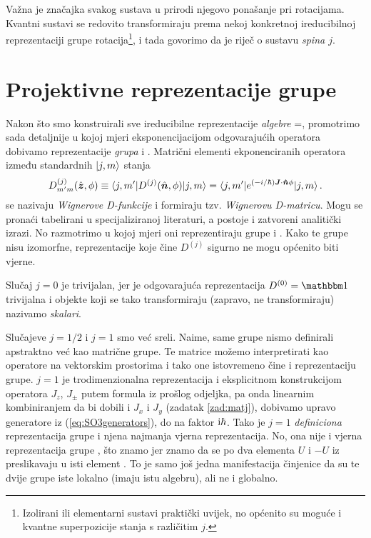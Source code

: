 Važna je značajka svakog sustava u prirodi 
njegovo ponašanje pri rotacijama. Kvantni sustavi se redovito
transformiraju prema nekoj konkretnoj ireducibilnoj reprezentaciji grupe
rotacija\footnote{Izolirani ili elementarni sustavi praktički uvijek, no
    općenito su moguće i kvantne superpozicije stanja s različitim $j$.}, i
 tada govorimo da je riječ o sustavu \emph{spina $j$}.


\section{Projektivne reprezentacije grupe }
 \label{sec:projektivnerep}

Nakon što smo konstruirali sve ireducibilne reprezentacije \emph{algebre} 
=, promotrimo sada detaljnije u kojoj mjeri eksponencijacijom
odgovarajućih operatora dobivamo reprezentacije \emph{grupa}  i .
Matrični elementi ekponenciranih operatora između standardnih
$| j, m \rangle$ stanja
\begin{equation}
    D^{(j)}_{m'm}(\hat{\vec{z}},\phi)  \equiv  \bra{j,m'} D^{(j)}(\hat{\vec{n}},\phi) \ket{j, m} 
    =\bra{j,m'} e^{(-i/\hbar)\vec{J}\cdot\unitn\phi}\ket{j, m} \,.
    \label{eq:WignerD}
\end{equation}
se nazivaju \emph{Wignerove D-funkcije} i formiraju tzv. \emph{Wignerovu D-matricu}.
Mogu se pronaći tabelirani u specijaliziranoj literaturi, a postoje
i zatvoreni analitički izrazi. No razmotrimo u kojoj mjeri oni
reprezentiraju grupe  i . Kako te grupe nisu izomorfne,
reprezentacije koje čine $D^{(j)}$ sigurno ne mogu općenito biti vjerne.

Slučaj $j=0$ je trivijalan, jer je odgovarajuća reprezentacija $D^{(0)}=\Eins$
trivijalna i objekte koji se tako transformiraju (zapravo, ne transformiraju)
nazivamo \emph{skalari}.

Slučajeve $j=1/2$ i $j=1$ smo već sreli. Naime, same grupe nismo definirali
apstraktno već kao matrične grupe. Te matrice možemo interpretirati kao operatore
na vektorskim prostorima i tako one istovremeno čine i reprezentaciju grupe.
$j=1$ je trodimenzionalna reprezentacija i eksplicitnom konstrukcijom
operatora $J_z$, $J_\pm$ putem formula iz prošlog odjeljka, pa onda linearnim
kombiniranjem da bi dobili i $J_x$ i $J_y$ (zadatak \ref{zad:matj}), 
dobivamo upravo generatore iz (\ref{eq:SO3generators}), do na faktor $\textrm{i}\hbar$.
Tako je $j=1$ \emph{definiciona} reprezentacija grupe  i njena najmanja
vjerna reprezentacija.
No, ona nije i vjerna reprezentacija grupe , što znamo jer znamo da
se po dva elementa $U$ i $-U$ iz   preslikavaju u isti element 
. To je samo još jedna manifestacija činjenice da su te dvije grupe
iste lokalno (imaju istu algebru), ali ne i globalno.



